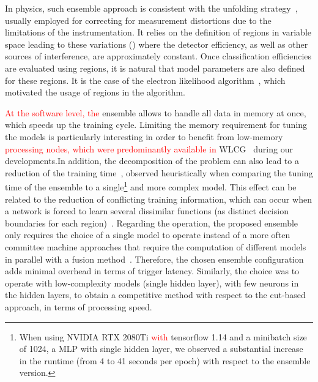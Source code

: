 In physics, such ensemble approach is consistent with the unfolding
strategy~\cite{Cowan1998}, usually employed for correcting for
measurement distortions due to the limitations of the instrumentation. It relies
on the definition of regions in variable space leading to these
variations (\eteta{}) where the detector efficiency, as well as other
sources of interference, are approximately constant. Once classification
efficiencies are evaluated using regions, it is natural that model parameters
are also defined for these regions. It is the case of the electron likelihood
algorithm~\cite{atlas_electron_id_offline}, which motivated the usage of
\eteta{} regions in the \rnn{} algorithm.

\textcolor{red}{At the software level, the} ensemble allows to handle all data in memory at once,
which speeds up the training cycle. Limiting the memory requirement for tuning
the models is particularly interesting in order to benefit from low-memory 
\textcolor{red}{ processing nodes, which were predominantly available in} 
WLCG~\cite{2015_lcg_tdr} during our
developments.\@ In addition, the decomposition of the problem can also lead to a
reduction of the training time~\cite{Polikar2006}, observed heuristically when
comparing the tuning time of the ensemble to a single\footnote{
  When using NVIDIA RTX 2080Ti \textcolor{red}{with} tensorflow 1.14 and a minibatch size of 1024, a 
  MLP with single hidden layer, we observed a substantial increase in the runtime (from 4 
  to 41 seconds per epoch) with respect to the ensemble version.
} and more complex model.
This effect can be related to the reduction of conflicting training information,
which can occur when a network is forced to learn several dissimilar functions
(as distinct decision boundaries for each region)~\cite{Auda1999,haykin_2008}.
Regarding the operation, the proposed ensemble only requires the choice of a
single model to operate instead of a more often committee machine approaches
that require the computation of different models in parallel with a fusion
method~\cite{zhou_ensemble}.  Therefore, the chosen ensemble configuration adds
minimal overhead in terms of trigger latency. Similarly, the choice was to
operate with low-complexity models (single hidden layer), with few neurons in
the hidden layers, to obtain a competitive method with respect to the cut-based
approach, in terms of processing speed.



